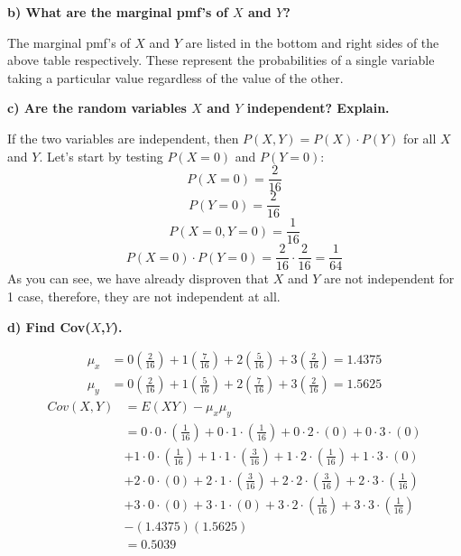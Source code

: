 \documentclass[12pt, letter]{article}
\begin{document}
\qquad \textbf{b) What are the marginal pmf’s of $X$ and $Y$?}
\begin{center}
	The marginal pmf's of $X$ and $Y$ are listed in the bottom and right sides of the above table respectively. These represent the probabilities of a single variable taking a particular value regardless of the value of the other.
\end{center}

\qquad \textbf{c) Are the random variables $X$ and $Y$ independent? Explain.}
\begin{center}
	If the two variables are independent, then $P(X,Y) = P(X) \cdot P(Y)$ for all $X$ and $Y$. Let's start by testing $P(X = 0)$ and $P(Y = 0)$:
	$$P(X = 0) = \frac{2}{16}$$
	$$P(Y = 0) = \frac{2}{16}$$
	$$P(X = 0, Y = 0) = \frac{1}{16}$$
	$$P(X = 0) \cdot P(Y = 0) = \frac{2}{16} \cdot \frac{2}{16} = \frac{1}{64}$$
	As you can see, we have already disproven that $X$ and $Y$ are not independent for 1 case, therefore, they are not independent at all.
\end{center}

\pagebreak

\qquad \textbf{d) Find Cov($X$,$Y$).}
\begin{center}
	\begin{align*}
		\mu_{x} &= 0\left(\frac{2}{16}\right) + 1\left(\frac{7}{16}\right) + 2\left(\frac{5}{16}\right) + 3\left(\frac{2}{16}\right) = 1.4375 \\
		\mu_{y} &= 0\left(\frac{2}{16}\right) + 1\left(\frac{5}{16}\right) + 2\left(\frac{7}{16}\right) + 3\left(\frac{2}{16}\right) = 1.5625
	\end{align*}
	\begin{align*}
		Cov(X,Y) &= E(XY) - \mu_{x} \mu_{y} \\
		&= 0 \cdot 0 \cdot \left(\frac{1}{16}\right) + 0 \cdot 1 \cdot \left(\frac{1}{16}\right) + 0 \cdot 2 \cdot (0) + 0 \cdot 3 \cdot (0) \\
		&+ 1 \cdot 0 \cdot \left(\frac{1}{16}\right) + 1 \cdot 1 \cdot \left(\frac{3}{16}\right) + 1 \cdot 2 \cdot \left(\frac{1}{16}\right) + 1 \cdot 3 \cdot (0) \\
		&+ 2 \cdot 0 \cdot (0) + 2 \cdot 1 \cdot \left(\frac{3}{16}\right) + 2 \cdot 2 \cdot \left(\frac{3}{16}\right) + 2 \cdot 3 \cdot \left(\frac{1}{16}\right) \\
		&+ 3 \cdot 0 \cdot (0) + 3 \cdot 1 \cdot (0) + 3 \cdot 2 \cdot \left(\frac{1}{16}\right) + 3 \cdot 3 \cdot \left(\frac{1}{16}\right) \\
		&- (1.4375)(1.5625) \\
		&= \boxed{0.5039}
	\end{align*}
\end{center}
\end{document}
